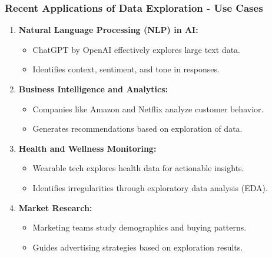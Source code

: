 \documentclass[aspectratio=169]{beamer}
\begin{document}
\begin{frame}[fragile]
    \frametitle{Recent Applications of Data Exploration - Use Cases}
    \begin{enumerate}
        \item \textbf{Natural Language Processing (NLP) in AI:}
            \begin{itemize}
                \item ChatGPT by OpenAI effectively explores large text data.
                \item Identifies context, sentiment, and tone in responses.
            \end{itemize}
        \item \textbf{Business Intelligence and Analytics:}
            \begin{itemize}
                \item Companies like Amazon and Netflix analyze customer behavior.
                \item Generates recommendations based on exploration of data.
            \end{itemize}
        \item \textbf{Health and Wellness Monitoring:}
            \begin{itemize}
                \item Wearable tech explores health data for actionable insights.
                \item Identifies irregularities through exploratory data analysis (EDA).
            \end{itemize}
        \item \textbf{Market Research:}
            \begin{itemize}
                \item Marketing teams study demographics and buying patterns.
                \item Guides advertising strategies based on exploration results.
            \end{itemize}
    \end{enumerate}
\end{frame}
\end{document}
